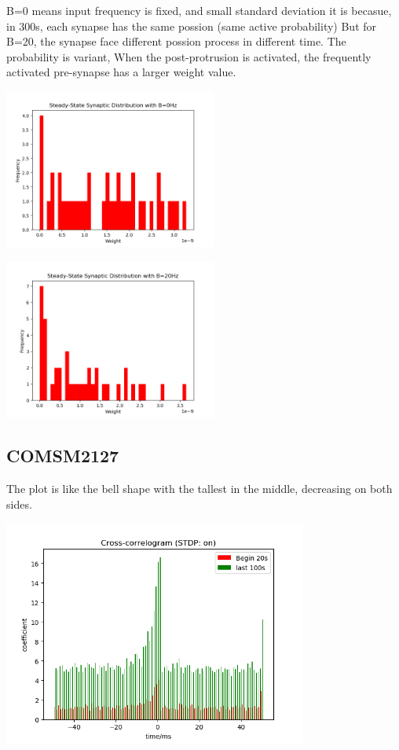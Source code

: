 \documentclass[fleqn,11pt]{article}
\begin{document}
\par B=0 means input frequency is fixed, and small standard deviation
it is becasue, in 300s, each synapse has the same possion (same active probability)
But for B=20, the synapse face different possion process in different time.
The probability is variant, When the post-protrusion is activated, the frequently activated pre-synapse has a larger weight value.
\begin{center}
  \begin{minipage}{\linewidth} 
  \begin{minipage}{0.45\linewidth}
    \includegraphics[width=7cm]{graphs/PartB_Questio4_B_0Hz.png}
  \end{minipage}
  \hspace{0.05\linewidth}
  \begin{minipage}{0.45\linewidth}
    \includegraphics[width=7cm]{graphs/PartB_Questio4_B_20Hz.png}
  \end{minipage}
\end{minipage} 
\end{center}

\newpage
\subsection*{COMSM2127}
The plot is like the bell shape with the tallest in the middle, decreasing on both sides.
\begin{center} 
  \includegraphics[width=10cm]{graphs/ParB_Cmos2.png}
\end{center}
\end{document}
